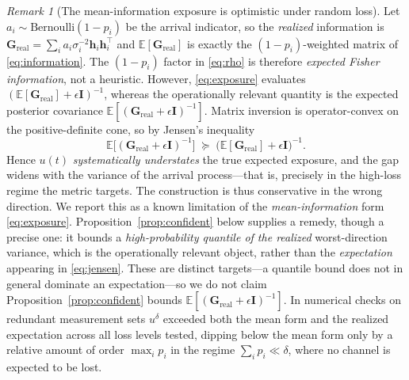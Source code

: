 \documentclass[journal]{IEEEtran}
\theoremstyle{plain}
\theoremstyle{definition}
\theoremstyle{remark}
\newtheorem{remark}{Remark}
\newcommand{\bh}{\mathbf{h}}
\newcommand{\bG}{\mathbf{G}}
\newcommand{\bI}{\mathbf{I}}
\begin{document}
\begin{remark}[The mean-information exposure is optimistic under random loss]
\label{rem:jensen}
Let $a_i\sim\mathrm{Bernoulli}(1-p_i)$ be the arrival indicator, so the
\emph{realized} information is
$\bG_{\mathrm{real}}=\sum_i a_i\sigma_i^{-2}\bh_i\bh_i^{\top}$ and
$\mathbb{E}[\bG_{\mathrm{real}}]$ is exactly the $(1-p_i)$-weighted matrix
of \eqref{eq:information}. The $(1-p_i)$ factor in \eqref{eq:rho} is
therefore \emph{expected Fisher information}, not a heuristic. However,
\eqref{eq:exposure} evaluates
$(\mathbb{E}[\bG_{\mathrm{real}}]+\epsilon\bI)^{-1}$, whereas the
operationally relevant quantity is the expected posterior covariance
$\mathbb{E}[(\bG_{\mathrm{real}}+\epsilon\bI)^{-1}]$. Matrix inversion is
operator-convex on the positive-definite cone, so by Jensen's inequality
\begin{equation}
\mathbb{E}\big[(\bG_{\mathrm{real}}+\epsilon\bI)^{-1}\big]\;\succeq\;
\big(\mathbb{E}[\bG_{\mathrm{real}}]+\epsilon\bI\big)^{-1}.
\label{eq:jensen}
\end{equation}
Hence $u(t)$ \emph{systematically understates} the true expected exposure,
and the gap widens with the variance of the arrival process---that is,
precisely in the high-loss regime the metric targets. The construction is
thus conservative in the wrong direction. We report this as a known
limitation of the \emph{mean-information} form
\eqref{eq:exposure}. Proposition~\ref{prop:confident} below supplies a
remedy, though a precise one: it bounds a \emph{high-probability quantile
of the realized} worst-direction variance, which is the operationally
relevant object, rather than the \emph{expectation} appearing in
\eqref{eq:jensen}. These are distinct targets---a quantile bound does not
in general dominate an expectation---so we do not claim
Proposition~\ref{prop:confident} bounds
$\mathbb{E}[(\bG_{\mathrm{real}}+\epsilon\bI)^{-1}]$. In numerical
checks on redundant measurement sets $u^{\delta}$ exceeded both the mean
form and the realized expectation across all loss levels tested, dipping
below the mean form only by a relative amount of order $\max_ip_i$ in the
regime $\sum_ip_i\ll\delta$, where no channel is expected to be lost.
\end{remark}
\end{document}
